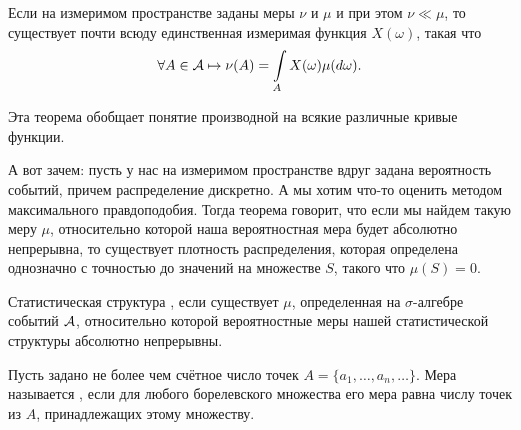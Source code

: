 \documentclass[../TV&MS.tex]{subfiles}
\begin{document}
\begin{Th}
    Если на измеримом пространстве заданы меры $\nu$ и $\mu$ и при этом
    $\nu \ll \mu$, то существует почти всюду единственная измеримая функция
    $X(\omega)$, такая что 
    $$\forall A \in \mathcal{A} \mapsto \nu(A) = \int\limits_{A}X(\omega)\mu(d\omega).$$
\end{Th} 

\begin{Wtf}
    Эта теорема обобщает понятие производной на всякие различные кривые функции.
\end{Wtf}
\begin{Why}
    А вот зачем: пусть у нас на измеримом пространстве вдруг задана вероятность событий, причем распределение дискретно.
    А мы хотим что-то оценить методом максимального правдоподобия.
    Тогда теорема говорит, что если мы найдем такую меру $\mu$,
    относительно которой наша вероятностная мера будет абсолютно непрерывна,
    то существует плотность распределения, которая определена однозначно с точностью до значений на множестве $S$, такого что $\mu(S) = 0$.
\end{Why} 

\begin{Def}
    Статистическая структура ,
    если существует $\mu$, определенная на $\sigma$-алгебре событий  $\mathcal{A}$,
    относительно которой вероятностные меры нашей статистической структуры абсолютно непрерывны.
\end{Def}

\begin{Def}
    Пусть задано не более чем счётное число точек $A = \{a_1, \ldots , a_n, \ldots \}$.
    Мера называется , если для любого борелевского множества
    его мера равна числу точек из $A$, принадлежащих этому множеству.
\end{Def}
\end{document}
